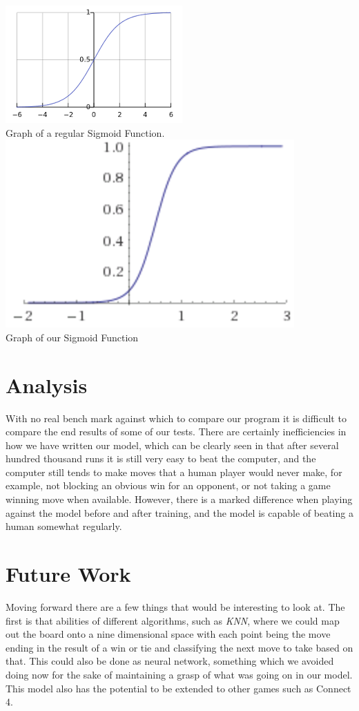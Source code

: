 \documentclass{article}
\begin{document}
\includegraphics[scale=0.7]{sigmoid.png} \\
Graph of a regular Sigmoid Function. \\
\includegraphics[scale=0.85]{newSigmoid.png} \\
Graph of our Sigmoid Function

\section{Analysis}
With no real bench mark against which to compare our program it is difficult to compare the end results of some of our tests. There are certainly inefficiencies in how we have written our model, which can be clearly seen in that after several hundred thousand runs it is still very easy to beat the computer, and the computer still tends to make moves that a human player would never make, for example, not blocking an obvious win for an opponent, or not taking a game winning move when available. However, there is a marked difference when playing against the model before and after training, and the model is capable of beating a human somewhat regularly.

\section{Future Work}
Moving forward there are a few things that would be interesting to look at. The first is that abilities of different algorithms, such as \textit{KNN}, where we could map out the board onto a nine dimensional space with each point being the move ending in the result of a win or tie and classifying the next move to take based on that. This could also be done as neural network, something which we avoided doing now for the sake of maintaining a grasp of what was going on in our model. This model also has the potential to be extended to other games such as Connect 4.
\end{document}
